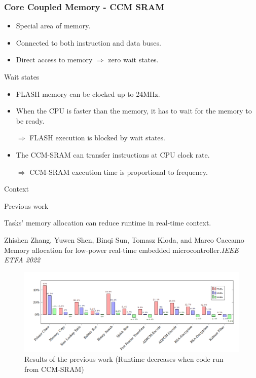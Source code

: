 \documentclass[
	11pt, %
]{beamer}
\begin{document}
\begin{frame}
    \frametitle{Core Coupled Memory - CCM SRAM}
	\begin{center}
		
	\end{center}
	\begin{itemize}
	\item Special area of memory. 
	\item Connected to both instruction and data buses.
	\item Direct access to memory $\Rightarrow$ zero wait states.
	\end{itemize}
\end{frame}

\begin{frame}{Wait states}
	\begin{itemize}
	\item FLASH memory can be clocked up to 24MHz.
	\item When the CPU is faster than the memory, it has to wait for the memory to be ready.
	
	$\Rightarrow$ FLASH execution is blocked by wait states. 
	\item The CCM-SRAM can transfer instructions at CPU clock rate.
	
	$\Rightarrow$ CCM-SRAM execution time is proportional to frequency. 
	\end{itemize} 
\end{frame}

\begin{frame}{Context}
	\begin{block}{Previous work}


		
		Tasks' memory allocation can reduce runtime in real-time context.
			\begin{thebibliography}{10}
				{\tiny
				\bibitem{} Zhishen Zhang, Yuwen Shen, Binqi Sun, Tomasz Kloda, and Marco Caccamo
				\newblock Memory allocation for low-power real-time embedded microcontroller.{\em{IEEE ETFA 2022}}
				}
			\end{thebibliography}
	\end{block}
	\begin{figure}
		\centering
		\includegraphics[scale=0.5]{images/boost.png}
		\caption{Results of the previous work (Runtime decreases when code run from CCM-SRAM)}
	\end{figure}
\end{frame}
\end{document}
